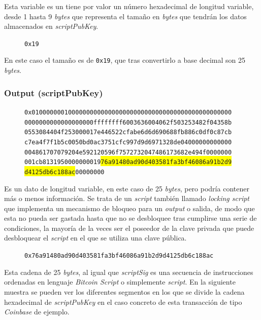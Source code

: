 \documentclass{article}
\begin{document}
    Esta variable es un tiene por valor un número hexadecimal de longitud variable, desde 1 hasta 9 \textit{bytes} que representa el tamaño en \textit{bytes} que tendrán los datos almacenados en \textit{scriptPubKey}.
    \begin{figure}[H]
        \texttt{0x19}
    \end{figure}
    En este caso el tamaño es de \texttt{0x19}, que tras convertirlo a base decimal son 25 \textit{bytes}.
    
    \subsubsection{Output (scriptPubKey)}
    
    \begin{figure}[H]
        \texttt{0x0100000001000000000000000000000000000000000000000000000} \\
        \texttt{0000000000000000000ffffffff6003636004062f503253482f04358b} \\
        \texttt{0553084404f253000017e446522cfabe6d6d690688fb886c0df0c87cb} \\
        \texttt{c7ea4f7f1b5c0050bd0ac3751cfc997d9d6971328de04000000000000} \\
        \texttt{004861707079204e592120596f7572732047486173682e494f0000000} \\
        \texttt{001cb8131950000000019\colorbox{Yellow}{76a91480ad90d403581fa3bf46086a91b2d9}} \\
        \texttt{\colorbox{Yellow}{d4125db6c188ac}00000000}
    \end{figure}
    
    Es un dato de longitud variable, en este caso de 25 \textit{bytes}, pero podría contener más o menos información. Se trata de un \textit{script} también llamado \textit{locking script} que implementa un mecanismo de bloqueo para un \textit{output} o salida, de modo que esta no pueda ser gastada hasta que no se desbloquee tras cumplirse una serie de condiciones, la mayoría de la veces ser el poseedor de la clave privada que puede desbloquear el \textit{script} en el que se utiliza una clave pública.
    
    \begin{figure}[H]
        \texttt{0x76a91480ad90d403581fa3bf46086a91b2d9d4125db6c188ac}
    \end{figure}
    
    Esta cadena de 25 \textit{bytes}, al igual que \textit{scriptSig} es una secuencia de instrucciones ordenadas en lenguaje \textit{Bitcoin Script} o simplemente \textit{script}. En la siguiente muestra se pueden ver los diferentes segmentos en los que se divide la cadena hexadecimal de \textit{scriptPubKey} en el caso concreto de esta transacción de tipo \textit{Coinbase} de ejemplo.
    
\end{document}
